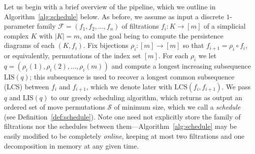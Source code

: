 \documentclass[sn-mathphys]{sn-jnl}
\begin{document}
Let us begin with a brief overview of the pipeline, which we outline in Algorithm~\ref{alg:schedule} below.
As before, we assume as input  a discrete $1$-parameter family $\mathcal{F} = (f_1, f_2, \dots, f_n)$ 
of filtrations $f_i : K \rightarrow [m]$ of a simplicial complex $K$ with $\lvert K \rvert =m$, and the goal being to compute the  persistence diagrams of each $(K,f_i)$.
Fix   bijections $\rho_i : [m] \to [m]$ so that 
$f_{i+1} = \rho_i \circ f_i$, or equivalently,  permutations of the index set $[m]$. For each $\rho_i$ we let 
$q = (\rho_i(1), \rho_i(2), \ldots, \rho_i(m) )$
and compute a longest increasing subsequence $\mathrm{LIS}(q)$;  this subsequence  is used to recover a longest common subsequence (LCS) between $f_i$ and $ f_{i+1} $, which we denote later with $\mathrm{LCS}(f_i, f_{i+1})$. We pass $q$ and $\mathrm{LIS}(q)$ to our greedy scheduling algorithm, which returns as output an ordered set of move permutations  $\mathcal{S}$ of minimum size, which we call a \emph{schedule} (see Definition~\ref{def:schedule}).
Note one need not explicitly store the family of filtrations nor the schedules between them---Algorithm~\ref{alg:schedule} may be easily modified to be completely \emph{online}, keeping at most two filtrations and one decomposition in memory at any given time. 
\end{document}
